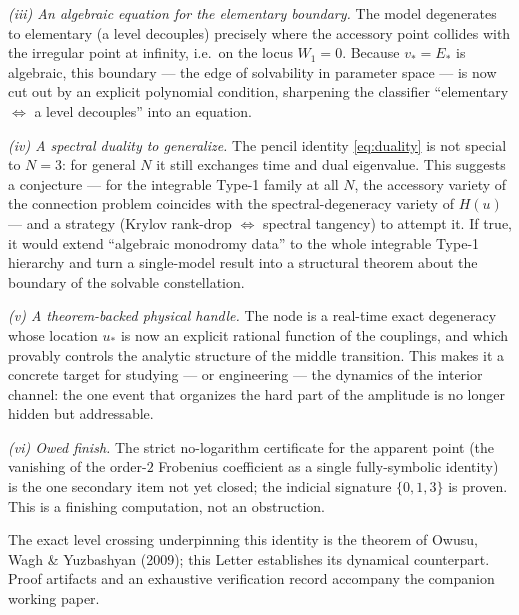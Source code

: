 \documentclass[aps,prl,reprint,nofootinbib,superscriptaddress]{revtex4-2}
\begin{document}
\emph{(iii) An algebraic equation for the elementary boundary.} The model degenerates to elementary
(a level decouples) precisely where the accessory point collides with the irregular point at infinity,
i.e.\ on the locus $W_1=0$. Because $v_*=E_*$ is algebraic, this boundary --- the edge of solvability
in parameter space --- is now cut out by an explicit polynomial condition, sharpening the classifier
``elementary $\Leftrightarrow$ a level decouples'' into an equation.

\emph{(iv) A spectral duality to generalize.} The pencil identity \eqref{eq:duality} is not special to
$N{=}3$: for general $N$ it still exchanges time and dual eigenvalue. This suggests a conjecture --- for
the integrable Type-1 family at all $N$, the accessory variety of the connection problem coincides with
the spectral-degeneracy variety of $H(u)$ --- and a strategy (Krylov rank-drop $\Leftrightarrow$
spectral tangency) to attempt it. If true, it would extend ``algebraic monodromy data'' to the whole
integrable Type-1 hierarchy and turn a single-model result into a structural theorem about the boundary
of the solvable constellation.

\emph{(v) A theorem-backed physical handle.} The node is a real-time exact degeneracy whose location
$u_*$ is now an explicit rational function of the couplings, and which provably controls the analytic
structure of the middle transition. This makes it a concrete target for studying --- or engineering ---
the dynamics of the interior channel: the one event that organizes the hard part of the amplitude is no
longer hidden but addressable.

\emph{(vi) Owed finish.} The strict no-logarithm certificate for the apparent point (the vanishing of
the order-$2$ Frobenius coefficient as a single fully-symbolic identity) is the one secondary item not
yet closed; the indicial signature $\{0,1,3\}$ is proven. This is a finishing computation, not an
obstruction.

\begin{acknowledgments}
The exact level crossing underpinning this identity is the theorem of Owusu, Wagh \& Yuzbashyan
(2009); this Letter establishes its dynamical counterpart. Proof artifacts and an exhaustive
verification record accompany the companion working paper.
\end{acknowledgments}
\end{document}
